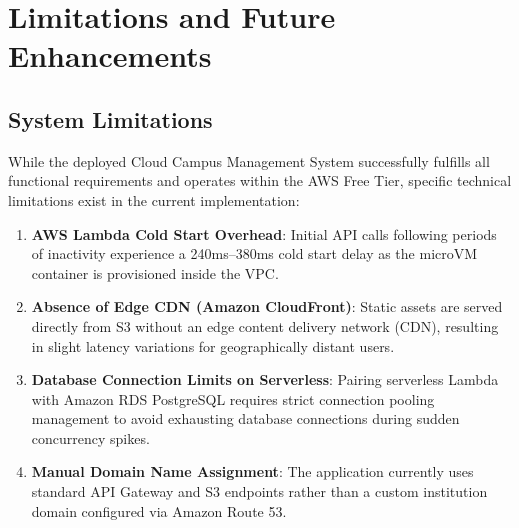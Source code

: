 \chapter{Limitations and Future Enhancements}
\label{chap:limitations}

\section{System Limitations}
While the deployed Cloud Campus Management System successfully fulfills all functional requirements and operates within the AWS Free Tier, specific technical limitations exist in the current implementation:
\begin{enumerate}
    \item \textbf{AWS Lambda Cold Start Overhead}: Initial API calls following periods of inactivity experience a 240ms–380ms cold start delay as the microVM container is provisioned inside the VPC.
    \item \textbf{Absence of Edge CDN (Amazon CloudFront)}: Static assets are served directly from S3 without an edge content delivery network (CDN), resulting in slight latency variations for geographically distant users.
    \item \textbf{Database Connection Limits on Serverless}: Pairing serverless Lambda with Amazon RDS PostgreSQL requires strict connection pooling management to avoid exhausting database connections during sudden concurrency spikes.
    \item \textbf{Manual Domain Name Assignment}: The application currently uses standard API Gateway and S3 endpoints rather than a custom institution domain configured via Amazon Route 53.
\end{enumerate}

